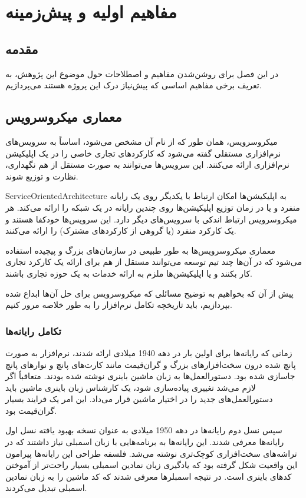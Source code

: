 \chapter{مفاهیم اولیه و پیش‌زمینه}

\section{مقدمه}
در این فصل برای روشن‌شدن مفاهیم و اصطلاحات حول موضوع این پژوهش، به تعریف برخی مفاهیم اساسی که پیش‌نیاز درک این پروژه هستند می‌پردازیم.

\section{معماری میکروسرویس}
میکروسرویس، همان طور که از نام آن مشخص می‌شود، اساساً به سرویس‌های نرم‌افزاری مستقلی گفته می‌شود که کارکردهای تجاری خاصی را در یک اپلیکیشن نرم‌افزاری ارائه می‌کنند. این سرویس‌ها می‌توانند به صورت مستقل از هم نگهداری، نظارت و توزیع شوند.

\gls{ServiceOrientedArchitecture}
به اپلیکیشن‌ها امکان ارتباط با یکدیگر روی یک رایانه منفرد و یا در زمان توزیع اپلیکیشن‌ها روی چندین رایانه در یک شبکه را ارائه می‌کند. هر میکروسرویس ارتباط اندکی با سرویس‌های دیگر دارد. این سرویس‌ها خودکفا هستند و یک کارکرد منفرد (یا گروهی از کارکردهای مشترک) را ارائه می‌کنند.

معماری میکروسرویس‌ها به طور طبیعی در سازمان‌های بزرگ و پیچیده استفاده می‌شود که در آن‌ها چند تیم توسعه می‌توانند مستقل از هم برای ارائه یک کارکرد تجاری کار بکنند و یا اپلیکیشن‌ها ملزم به ارائه خدمات به یک حوزه تجاری باشند.

پیش از آن که بخواهیم به توضیح مسائلی که میکروسرویس برای حل آن‌ها ابداع شده بپردازیم، باید تاریخچه تکامل نرم‌افزار را به طور خلاصه مرور کنیم.

\subsection{تکامل رایانه‌ها}
زمانی که رایانه‌ها برای اولین بار در دهه 1940 میلادی ارائه شدند، نرم‌افزار به صورت پانچ شده درون سخت‌افزارهای بزرگ و گران‌قیمت مانند کارت‌های پانچ و نوارهای پانچ جاسازی شده بود. دستورالعمل‌ها به زبان ماشین باینری نوشته شده بودند. متعاقباً اگر لازم می‌شد تغییری پیاده‌سازی شود، یک کارشناس زبان باینری ماشین باید دستورالعمل‌های جدید را در اختیار ماشین قرار می‌داد. این امر یک فرایند بسیار گران‌قیمت بود.

سپس نسل دوم رایانه‌ها در دهه 1950 میلادی به عنوان نسخه بهبود یافته نسل اول رایانه‌ها معرفی شدند. این رایانه‌ها به برنامه‌هایی با زبان اسمبلی نیاز داشتند که در تراشه‌های سخت‌افزاری کوچک‌تری نوشته می‌شد. فلسفه طراحی این رایانه‌ها پیرامون این واقعیت شکل گرفته بود که یادگیری زبان نمادین اسمبلی بسیار راحت‌تر از آموختن کدهای باینری است. در نتیجه اسمبلرها معرفی شدند که کد ماشین را به زبان نمادین اسمبلی تبدیل می‌کردند.

